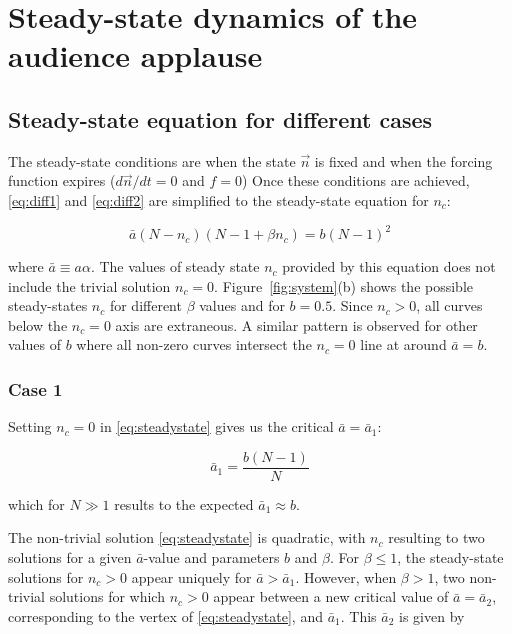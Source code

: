 \chapter{Steady-state dynamics of the audience applause}
\label{chap3}
\def\statepsi{\mid \psi \; \rangle}
\def\energy{\mid E_{\vec{k}} \; \rangle}
\def\psixt{\mid \psi(x,t) \; \rangle}
\def\statepsixtrev{\mid \psi(x,t=T_{rev}) \; \rangle}
\def\statepsixt0{\mid \psi(x,t=0) \; \rangle}
\def\lowering{S^-_l \mid 0 \; \rangle}
\def\loweringa{S^-_m \; S^-_l \mid 0 \; \rangle}



\section{Steady-state equation for different cases}

\hspace{\parindent} The steady-state conditions are when the state $\vec{n}$ is fixed and when the forcing function expires ($d\vec{n}/dt = 0$ and $f=0$)
Once these conditions are achieved, \eqref{eq:diff1} and \eqref{eq:diff2} are simplified to the steady-state equation for $n_c$:

\begin{equation}\label{eq:steadystate}
\bar{a}(N-n_{c})(N-1 + \beta n_{c}) = b(N-1)^{2}
\end{equation}

where $\bar{a}\equiv a\alpha$. 
The values of steady state $n_{c}$ provided by this equation does not include the trivial solution $n_{c}=0$.
Figure~\ref{fig:system}(b) shows the possible steady-states $n_{c}$ for different $\beta$ values and for $b = 0.5$.
Since $n_{c}>0$, all curves below the $n_{c}=0$ axis are extraneous.
A similar pattern is observed for other values of $b$ where all non-zero curves intersect the $n_{c}=0$ line at around $\bar{a} = b$.

\subsection{Case 1}
Setting $n_{c} = 0$ in \eqref{eq:steadystate} gives us the critical $\bar{a} = \bar{a}_{1}$:

\begin{equation}
\bar{a}_{1} = \frac{b(N-1)}{N}
\end{equation}

which for $N\gg1$ results to the expected $\bar{a}_{1}\approx b$.

The non-trivial solution \eqref{eq:steadystate} is quadratic, with $n_{c}$ resulting to two solutions for a given $\bar{a}$-value and parameters $b$ and $\beta$.
For $\beta\leq1$, the steady-state solutions for $n_{c}>0$ appear uniquely for $\bar{a}>\bar{a}_{1}$.
However, when $\beta>1$, two non-trivial solutions for which $n_{c}>0$ appear between a new critical value of $\bar{a}=\bar{a}_{2}$, corresponding to the vertex of \eqref{eq:steadystate}, and $\bar{a}_{1}$.
This $\bar{a}_{2}$ is given by

